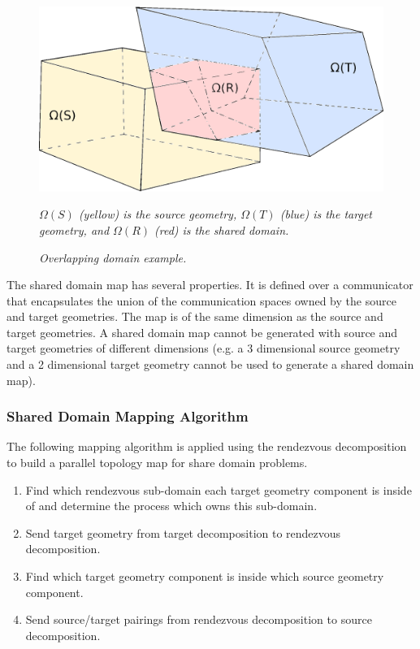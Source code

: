 \documentclass[letterpaper,12pt]{article}
\begin{document}
\begin{figure}[htpb!]
  \centering
  \includegraphics[width=5in]{overlapping_domain.eps}
  \caption{\sl Overlapping domain example.} {\sl $\Omega(S)$ (yellow)
    is the source geometry, $\Omega(T)$ (blue) is the target geometry,
    and $\Omega(R)$ (red) is the shared domain.}
  \label{fig:shared_domain}
\end{figure}

The shared domain map has several properties. It is defined over a
communicator that encapsulates the union of the communication spaces
owned by the source and target geometries.  The map is of the same
dimension as the source and target geometries. A shared domain map
cannot be generated with source and target geometries of different
dimensions (e.g. a 3 dimensional source geometry and a 2 dimensional
target geometry cannot be used to generate a shared domain map).

\subsubsection{Shared Domain Mapping Algorithm}
\label{subsubsec:shared_domain_alg}
The following mapping algorithm is applied using the rendezvous
decomposition to build a parallel topology map for share domain
problems.

\begin{enumerate}
\item Find which rendezvous sub-domain each target geometry component
  is inside of and determine the process which owns this sub-domain.
\item Send target geometry from target decomposition to rendezvous
  decomposition.
\item Find which target geometry component is inside which source
  geometry component.
\item Send source/target pairings from rendezvous decomposition to
  source decomposition.
\end{enumerate}
\end{document}
